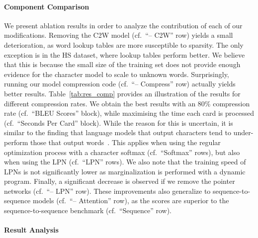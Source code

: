 \documentclass[11pt]{article}
\begin{document}
\paragraph{Component Comparison}
We present ablation results in order to analyze the contribution of each of our modifications.
Removing the C2W model (cf.~``-- C2W'' row) yields a small deterioration, as word lookup tables are more susceptible to sparsity.
The only exception is in the HS dataset, where lookup tables perform better.
We believe that this is because the small size of the training set does not provide enough evidence for the character model to scale to unknown words. Surprisingly, running our model compression code (cf.~``-- Compress'' row) actually yields better results.
Table~\ref{tab:res_comp} provides an illustration of the results for different compression rates.
We obtain the best results with an 80\% compression rate (cf.~``BLEU Scores'' block), while maximising the time each card is processed (cf.~``Seconds Per Card'' block).
While the reason for this is uncertain, it is similar to the finding that language models that output characters tend to under-perform those that output words~\cite{DBLP:journals/corr/JozefowiczVSSW16}.
This applies when using the regular optimization process with a character softmax (cf.~``Softmax'' rows), but also when using the LPN (cf.~``LPN'' rows).
We also note that the training speed of LPNs is not significantly lower as marginalization is performed with a dynamic program.
Finally, a significant decrease is observed if we remove the pointer networks (cf.~``-- LPN'' row).
These improvements also generalize to sequence-to-sequence models (cf.~``-- Attention'' row), as the scores are superior to the sequence-to-sequence benchmark (cf.~``Sequence'' row).

\paragraph{Result Analysis}
\end{document}
